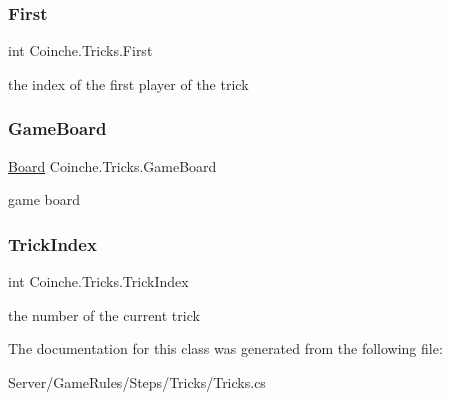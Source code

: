 \subsubsection{\texorpdfstring{First}{First}}
{\footnotesize\ttfamily int Coinche.\+Tricks.\+First\hspace{0.3cm}{\ttfamily [private]}}



the index of the first player of the trick 

\mbox{\label{class_coinche_1_1_tricks_a98e0ea7da7ca1f0e85513c91bf311fc6}} 
\subsubsection{\texorpdfstring{Game\+Board}{GameBoard}}
{\footnotesize\ttfamily \hyperlink{class_coinche_1_1_board}{Board} Coinche.\+Tricks.\+Game\+Board\hspace{0.3cm}{\ttfamily [private]}}



game board 

\mbox{\label{class_coinche_1_1_tricks_a234997b0338ef3f6fe31159e789ff926}} 
\subsubsection{\texorpdfstring{Trick\+Index}{TrickIndex}}
{\footnotesize\ttfamily int Coinche.\+Tricks.\+Trick\+Index\hspace{0.3cm}{\ttfamily [private]}}



the number of the current trick 



The documentation for this class was generated from the following file\+:\begin{DoxyCompactItemize}
\item 
Server/\+Game\+Rules/\+Steps/\+Tricks/Tricks.\+cs\end{DoxyCompactItemize}

